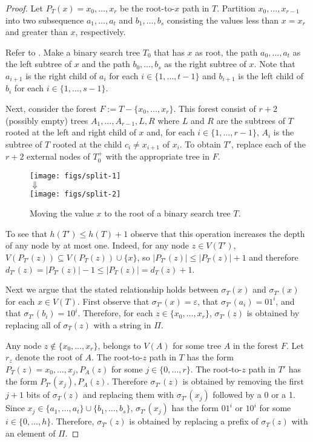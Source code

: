 \documentclass[kpfonts]{patmorin}
\begin{document}
\begin{proof}
Let $P_T(x)=x_0,\ldots,x_r$ be the root-to-$x$ path in $T$.  Partition $x_0,\ldots,x_{r-1}$ into two subsequence $a_1,\ldots,a_t$ and $b_1,\ldots,b_s$ consisting the values less than $x=x_r$ and greater than $x$, respectively.  

Refer to . Make a binary search tree $T_0$ that has $x$ as root, the path $a_0,\ldots,a_t$ as the left subtree of $x$ and the path $b_0,\ldots,b_s$ as the right subtree of $x$.  Note that $a_{i+1}$ is the right child of $a_i$ for each $i\in\{1,\ldots,t-1\}$ and $b_{i+1}$ is the left child of $b_i$ for each $i\in\{1,\ldots,s-1\}$. 

Next, consider the forest $F:=T-\{x_0,\ldots,x_r\}$. This forest consist of $r+2$ (possibly empty) trees $A_1,\ldots,A_{r-1},L,R$ where $L$ and $R$ are the subtrees of $T$ rooted at the left and right child of $x$ and, for each $i\in\{1,\ldots,r-1\}$, $A_i$ is the subtree of $T$ rooted at the child $c_i\neq x_{i+1}$ of $x_i$.  To obtain $T'$, replace each of the $r+2$ external nodes of $T_0^+$ with the appropriate tree in $F$.

\begin{figure}
  \begin{center}
    \texttt{[image: figs/split-1]} \\[1ex]
    $\Downarrow$ \\[1ex]
    \texttt{[image: figs/split-2]}
  \end{center}
  \caption{Moving the value $x$ to the root of a binary search tree $T$.}
\end{figure}

To see that $h(T')\le h(T)+1$ observe that this operation increases the depth of any node by at most one.  Indeed, for any node $z\in V(T')$, $V(P_{T'}(z))\subseteq V(P_T(z))\cup\{x\}$, so $|P_{T'}(z)|\le |P_T(z)|+1$ and therefore $d_{T'}(z) = |P_{T'}(z)|-1 \le |P_{T}(z)| = d_T(z)+1$. 

Next we argue that the stated relationship holds between $\sigma_T(x)$ and $\sigma_{T'}(x)$ for each $x\in V(T)$.  First observe that $\sigma_{T'}(x)=\varepsilon$, that $\sigma_{T'}(a_i)=01^i$, and that $\sigma_{T'}(b_i)=10^i$.  Therefore, for each $z\in\{x_0,\ldots,x_r\}$, $\sigma_{T'}(z)$ is obtained by replacing all of $\sigma_T(z)$ with a string in $\Pi$.

Any node $z\not\in\{x_0,\ldots,x_r\}$, belongs to $V(A)$ for some tree $A$ in the forest $F$.  Let $r_z$ denote the root of $A$.  The root-to-$z$ path in $T$ has the form $P_{T}(z)=x_0,\ldots,x_j,P_{A}(z)$ for some $j\in\{0,\ldots,r\}$.  The root-to-$z$ path in $T'$ has the form $P_{T'}(x_j),P_{A}(z)$.  Therefore $\sigma_{T'}(z)$ is obtained by removing the first $j+1$ bits of $\sigma_T(z)$ and replacing them with $\sigma_{T'}(x_j)$ followed by a 0 or a 1.  Since $x_j\in\{a_1,\ldots,a_t\}\cup\{b_1,\ldots,b_s\}$, $\sigma_{T'}(x_j)$ has the form $01^i$ or $10^i$ for some $i\in\{0,\ldots,h\}$.  Therefore, $\sigma_{T'}(z)$ is obtained by replacing a prefix of $\sigma_T(z)$ with an element of $\Pi$.
\end{proof}
\end{document}
